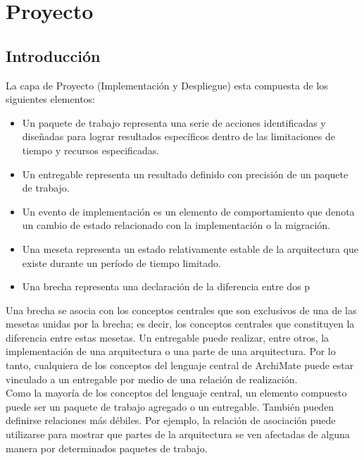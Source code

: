 \chapter{Proyecto}
\section{Introducción}
La capa de Proyecto (Implementación y Despliegue) esta compuesta de los siguientes elementos:

\begin{itemize}
	\item Un paquete de trabajo representa una serie de acciones identificadas y diseñadas para lograr resultados específicos dentro de las limitaciones de tiempo y recursos especificadas.
	\item Un entregable representa un resultado definido con precisión de un paquete de trabajo.
	\item Un evento de implementación es un elemento de comportamiento que denota un cambio de estado relacionado con la implementación o la migración.
	\item Una meseta representa un estado relativamente estable de la arquitectura que existe durante un período de tiempo limitado.
	\item Una brecha representa una declaración de la diferencia entre dos p
\end{itemize}

Una brecha se asocia con los conceptos centrales que son exclusivos de una de las mesetas unidas por la brecha; es decir, los conceptos centrales que constituyen la diferencia entre estas mesetas. Un entregable puede realizar, entre otros, la implementación de una arquitectura o una parte de una arquitectura. Por lo tanto, cualquiera de los conceptos del lenguaje central de ArchiMate puede estar vinculado a un entregable por medio de una relación de realización.\\

Como la mayoría de los conceptos del lenguaje central, un elemento compuesto puede ser un paquete de trabajo agregado o un entregable. También pueden definirse relaciones más débiles. Por ejemplo, la relación de asociación puede utilizarse para mostrar que partes de la arquitectura se ven afectadas de alguna manera por determinados paquetes de trabajo.



